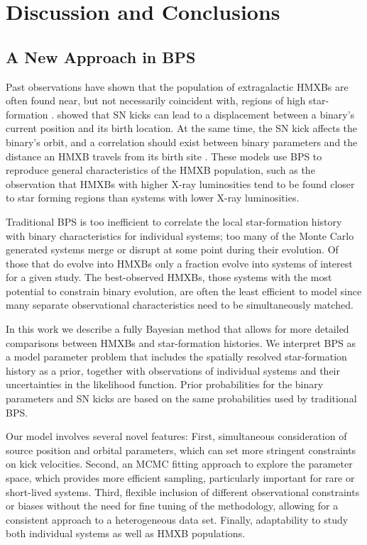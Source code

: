\documentclass[usenatbib]{mnras}
\begin{document}
\section{Discussion and Conclusions}
\label{sec:discussion}

\subsection{A New Approach in BPS}

Past observations have shown that the population of extragalactic HMXBs are often found near, but not necessarily coincident with, regions of high star-formation \citep{zezas02b,kaaret04}. \citet{sepinsky05} showed that SN kicks can lead to a displacement between a binary's current position and its birth location. At the same time, the SN kick affects the binary's orbit, and a correlation should exist between binary parameters and the distance an HMXB travels from its birth site \citep{zuo10,zuo15}. These models use BPS to reproduce general characteristics of the HMXB population, such as the observation that HMXBs with higher X-ray luminosities tend to be found closer to star forming regions than systems with lower X-ray luminosities.


Traditional BPS is too inefficient to correlate the local star-formation history with binary characteristics for individual systems; too many of the Monte Carlo generated systems merge or disrupt at some point during their evolution. Of those that do evolve into HMXBs only a fraction evolve into systems of interest for a given study. The best-observed HMXBs, those systems with the most potential to constrain binary evolution, are often the least efficient to model since many separate observational characteristics need to be simultaneously matched.


In this work we describe a fully Bayesian method that allows for more detailed comparisons between HMXBs and star-formation histories. We interpret BPS as a model parameter problem that includes the spatially resolved star-formation history as a prior, together with observations of individual systems and their uncertainties in the likelihood function. Prior probabilities for the binary parameters and SN kicks are based on the same probabilities used by traditional BPS.


Our model involves several novel features: First, simultaneous consideration of source position and orbital parameters, which can set more stringent constraints on kick velocities. Second, an MCMC fitting approach to explore the parameter space, which provides more efficient sampling, particularly important for rare or short-lived systems. Third, flexible inclusion of different observational constraints or biases without the need for fine tuning of the methodology, allowing for a consistent approach to a heterogeneous data set. Finally, adaptability to study both individual systems as well as HMXB populations.
\end{document}
